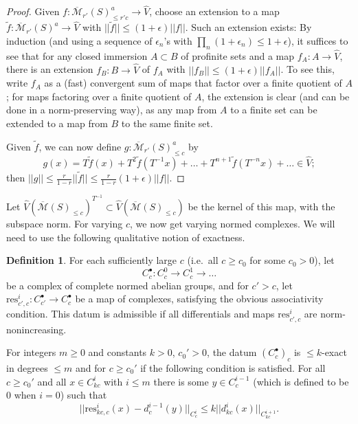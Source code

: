 \documentclass[11pt]{amsart}
\renewcommand*{\tilde}{\widetilde}
\numberwithin{equation}{section}
\numberwithin{theorem}{section}
\theoremstyle{definition}
\newtheorem{definition}[theorem]{Definition}
\begin{document}
\begin{proof} Given $f: \overline{\mathcal M}_{r'}(S)_{\leq r'c}^a\to \widehat{V}$, choose an extension to a map $\tilde{f}: \overline{\mathcal M}_{r'}(S)^a\to \widehat{V}$ with $||\tilde{f}||\leq (1+\epsilon)||f||$. Such an extension exists: By induction (and using a sequence of $\epsilon_n$'s with $\prod_n (1+\epsilon_n)\leq 1+\epsilon$), it suffices to see that for any closed immersion $A\subset B$ of profinite sets and a map $f_A: A\to \widehat{V}$, there is an extension $f_B: B\to \widehat{V}$ of $f_A$ with $||f_B||\leq (1+\epsilon)||f_A||$. To see this, write $f_A$ as a (fast) convergent sum of maps that factor over a finite quotient of $A$; for maps factoring over a finite quotient of $A$, the extension is clear (and can be done in a norm-preserving way), as any map from $A$ to a finite set can be extended to a map from $B$ to the same finite set.

Given $\tilde{f}$, we can now define $g: \overline{\mathcal M}_{r'}(S)_{\leq c}^a$ by
\[
g(x) = T\tilde{f}(x)+T^2\tilde{f}(T^{-1}x)+\ldots+T^{n+1}\tilde{f}(T^{-n}x)+\ldots\in \widehat{V};
\]
then $||g||\leq \frac r{1-r}||\tilde{f}||\leq \frac r{1-r}(1+\epsilon)||f||$.
\end{proof}

Let $\widehat{V}(\overline{\mathcal M}(S)_{\leq c})^{T^{-1}}\subset \widehat{V}(\overline{\mathcal M}(S)_{\leq c})$ be the kernel of this map, with the subspace norm. For varying $c$, we now get varying normed complexes. We will need to use the following qualitative notion of exactness.

\begin{definition} For each sufficiently large $c$ (i.e.~all $c\geq c_0$ for some $c_0>0$), let
\[
C_c^\bullet: C_c^0\to C_c^1\to\ldots
\]
be a complex of complete normed abelian groups, and for $c'>c$, let $\mathrm{res}_{c',c}^i: C_{c'}^\bullet\to C_c^\bullet$ be a map of complexes, satisfying the obvious associativity condition. This datum is admissible if all differentials and maps $\mathrm{res}_{c',c}^i$ are norm-nonincreasing.

For integers $m\geq 0$ and constants $k>0$, $c_0'>0$, the datum $(C_c^\bullet)_c$ is $\leq k$-exact in degrees $\leq m$ and for $c\geq c_0'$ if the following condition is satisfied. For all $c\geq c_0'$ and all $x\in C_{kc}^i$ with $i\leq m$ there is some $y\in C_c^{i-1}$ (which is defined to be $0$ when $i=0$) such that
\[
||\mathrm{res}_{kc,c}^i(x)-d_c^{i-1}(y)||_{C_c^i}\leq k||d_{kc}^i(x)||_{C_{kc}^{i+1}}.
\]
\end{definition}
\end{document}
